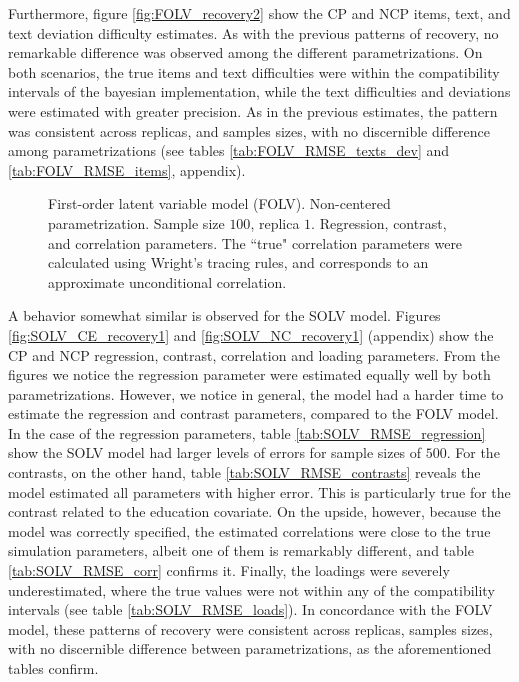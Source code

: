 Furthermore, figure \ref{fig:FOLV_recovery2} show the CP and NCP items, text, and text deviation difficulty estimates. As with the previous patterns of recovery, no remarkable difference was observed among the different parametrizations. On both scenarios, the true items and text difficulties were within the compatibility intervals of the bayesian implementation, while the text difficulties and deviations were estimated with greater precision. As in the previous estimates, the pattern was consistent across replicas, and samples sizes, with no discernible difference among parametrizations (see tables \ref{tab:FOLV_RMSE_texts_dev} and \ref{tab:FOLV_RMSE_items}, appendix).
%
\begin{figure}[H]
	\centering
	\begin{subfigure}
		\texttt{[image: FOLV\_NC\_J100\_Ndata1\_regression]}
	\end{subfigure}
	\begin{subfigure}
		\texttt{[image: FOLV\_NC\_J100\_Ndata1\_corr]}
	\end{subfigure}
	\caption[First-order latent variable model (FOLV). Non-centered parametrization. Sample size $100$, replica $1$. Regression, contrast, and correlation parameters.]%
	{First-order latent variable model (FOLV). Non-centered parametrization. Sample size $100$, replica $1$. Regression, contrast, and correlation parameters. The ``true" correlation parameters were calculated using Wright's tracing rules, and corresponds to an approximate unconditional correlation.}
	\label{fig:FOLV_NC_recovery1}
\end{figure}

A behavior somewhat similar is observed for the SOLV model. Figures \ref{fig:SOLV_CE_recovery1} and \ref{fig:SOLV_NC_recovery1} (appendix) show the CP and NCP regression, contrast, correlation and loading parameters. From the figures we notice the regression parameter were estimated equally well by both parametrizations. However, we notice in general, the model had a harder time to estimate the regression and contrast parameters, compared to the FOLV model. In the case of the regression parameters, table \ref{tab:SOLV_RMSE_regression} show the SOLV model had larger levels of errors for sample sizes of $500$. For the contrasts, on the other hand, table \ref{tab:SOLV_RMSE_contrasts} reveals the model estimated all parameters with higher error. This is particularly true for the contrast related to the education covariate. On the upside, however, because the model was correctly specified, the estimated correlations were close to the true simulation parameters, albeit one of them is remarkably different, and table \ref{tab:SOLV_RMSE_corr} confirms it. Finally, the loadings were severely underestimated, where the true values were not within any of the compatibility intervals (see table \ref{tab:SOLV_RMSE_loads}). In concordance with the FOLV model, these patterns of recovery were consistent across replicas, samples sizes, with no discernible difference between parametrizations, as the aforementioned tables confirm.

